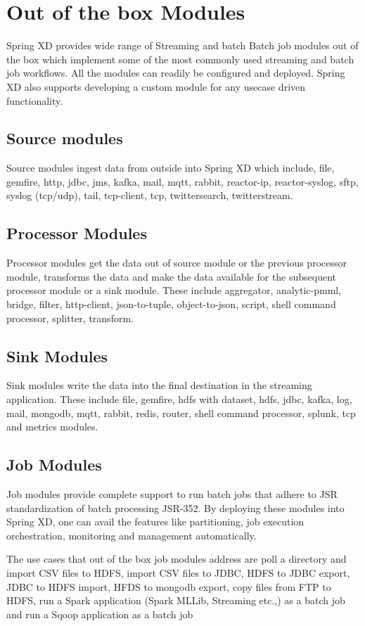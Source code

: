 \section{Out of the box Modules}
 Spring XD provides wide range of Streaming and batch Batch job modules out of the box which implement 
some of the most commonly used streaming and batch job workflows. All the modules can readily be configured and deployed.
Spring XD also supports developing a custom module for any usecase driven functionality.

\subsection{Source modules}

  Source modules ingest data from outside into Spring XD which include, file, gemfire,
http, jdbc, jms, kafka, mail, mqtt, rabbit, reactor-ip, reactor-syslog, sftp, 
syslog (tcp/udp), 
tail, tcp-client, tcp, twittersearch, twitterstream.

\subsection{Processor Modules}
  Processor modules get the data out of source module or the previous processor module, transforms
the data and make the data available for the subsequent processor module or a sink module.
These include aggregator, analytic-pmml, bridge, filter, http-client, json-to-tuple,
object-to-json, script, shell command processor, splitter, transform.

\subsection{Sink Modules}
  Sink modules write the data into the final destination in the streaming application.
These include file, gemfire, hdfs with dataset, hdfs, jdbc, kafka, log, mail, mongodb,
mqtt, rabbit, redis, router, shell command processor, splunk, tcp and metrics modules.

\subsection{Job Modules}

  Job modules provide complete support to run batch jobs that adhere to JSR standardization of
batch processing JSR-352. By deploying these modules into Spring XD, one can avail the 
features like partitioning, job execution orchestration, monitoring and  management
automatically. 

\par

The use cases that out of the box job modules address are poll a directory and import CSV files to HDFS, 
import CSV files to JDBC, HDFS to JDBC export, JDBC to HDFS import, HFDS to mongodb export, copy files from FTP to HDFS, 
run a Spark application (Spark MLLib, Streaming etc.,) as a batch job and 
run a Sqoop application as a batch job

